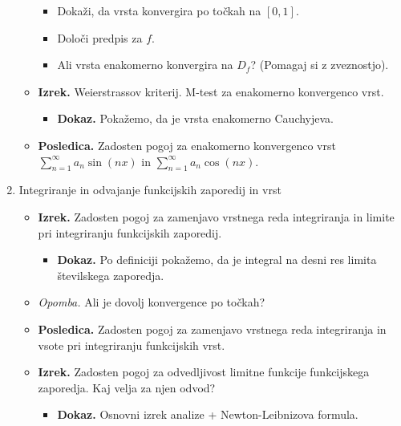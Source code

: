 \begin{enumerate}
\begin{itemize}
        \begin{itemize}
            \item Dokaži, da vrsta konvergira po točkah na $[0,1]$.
            \item Določi predpis za $f$.
            \item Ali vrsta enakomerno konvergira na $D_f$? (Pomagaj si z zveznostjo).
        \end{itemize}
        \item \colorbox{blue!30}{\textbf{Izrek.}} Weierstrassov kriterij. M-test za enakomerno konvergenco vrst.
        \begin{itemize}
            \item \colorbox{green!30}{\textbf{Dokaz.}} Pokažemo, da je vrsta enakomerno Cauchyjeva.
        \end{itemize}         
        \item \colorbox{orange!30}{\textbf{Posledica.}} Zadosten pogoj za enakomerno konvergenco vrst $\sum_{n=1}^{\infty} a_n \sin (nx)$ in $\sum_{n=1}^{\infty} a_n \cos (nx)$.
    \end{itemize}
    \item Integriranje in odvajanje funkcijskih zaporedij in vrst
    \begin{itemize}
        \item \colorbox{blue!30}{\textbf{Izrek.}} Zadosten pogoj za zamenjavo vrstnega reda integriranja in limite pri integriranju funkcijskih zaporedij.     
        \begin{itemize}
            \item \colorbox{green!30}{\textbf{Dokaz.}} Po definiciji pokažemo, da je integral na desni res limita številskega zaporedja.
        \end{itemize} 
        \item \colorbox{yellow!30}{\emph{Opomba.}} Ali je dovolj konvergence po točkah?        
        \item \colorbox{orange!30}{\textbf{Posledica.}} Zadosten pogoj za zamenjavo vrstnega reda integriranja in vsote pri integriranju funkcijskih vrst.
        \item \colorbox{blue!30}{\textbf{Izrek.}} Zadosten pogoj za odvedljivost limitne funkcije funkcijskega zaporedja. Kaj velja za njen odvod?
        \begin{itemize}
            \item \colorbox{green!30}{\textbf{Dokaz.}} Osnovni izrek analize + Newton-Leibnizova formula.
        \end{itemize} 

\end{itemize}
\end{enumerate}
